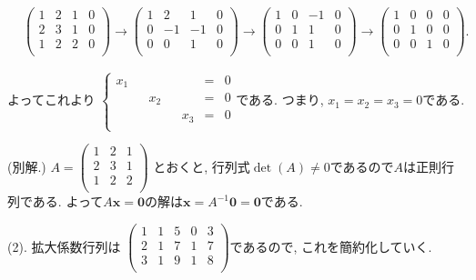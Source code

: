 \documentclass[dvipdfmx,a4paper,11pt]{article}
\theoremstyle{definition}
\begin{document}
 \begin{align*}
 &\begin{pmatrix}
1 & 2&1&0\\
2 & 3&1&0\\
1 & 2&2&0\\
 \end{pmatrix}
 \overset{}{\longrightarrow} 
 \begin{pmatrix}
1 & 2&1&0\\
0 & -1&-1&0\\
0 & 0&1&0\\
 \end{pmatrix}
 \overset{}{\longrightarrow} 
 \begin{pmatrix}
1 & 0&-1&0\\
0 & 1&1&0\\
0 & 0&1&0\\
 \end{pmatrix}
 \overset{}{\longrightarrow} 
  \begin{pmatrix}
1 & 0&0&0\\
0 & 1&0&0\\
0 & 0&1&0\\
 \end{pmatrix}.
 \end{align*}
 
よってこれより
$
 \left\{ 
\begin{matrix}
x_1& &  &  & &  = & 0 \\
& & x_2&  & &  = & 0 \\
& & &  & x_3&  = & 0 \\
\end{matrix}
\right.
 $である.
 つまり, $x_1=x_2=x_3=0$である.
 
 (別解.) 
 $A=
 \begin{pmatrix}
1 & 2&1\\
2 & 3&1\\
1 & 2&2\\
 \end{pmatrix}
 $
 とおくと, 行列式$\det(A)\neq 0$であるので$A$は正則行列である.
 よって$A \bm{x} = \bm{0}$の解は$\bm{x} = A^{-1}\bm{0} = \bm{0}$である.

 
 (2).
拡大係数行列は
$
\begin{pmatrix}
1&1&5&0&3\\
2&1&7&1&7\\
3&1&9&1&8\\
 \end{pmatrix}
 $であるので, これを簡約化していく.
 
\end{document}
